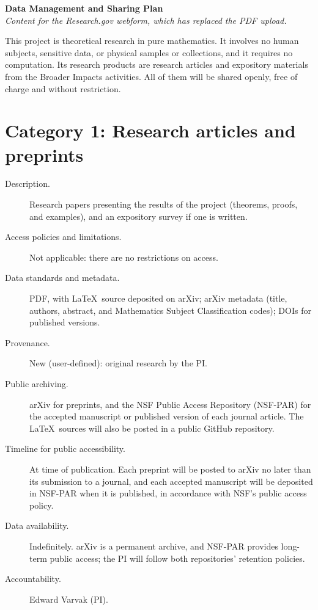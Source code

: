 \documentclass[11pt]{article}
\begin{document}
\begin{center}
  {\Large\bfseries Data Management and Sharing Plan}\\[5pt]
  \emph{Content for the Research.gov webform, which has replaced the PDF upload.}
\end{center}

This project is theoretical research in pure mathematics. It involves no human subjects,
sensitive data, or physical samples or collections, and it requires no computation. Its
research products are research articles and expository materials from the Broader Impacts
activities. All of them will be shared openly, free of charge and without restriction.

\section*{Category 1: Research articles and preprints}

\begin{description}
  \item[Description.] Research papers presenting the results of the project (theorems,
  proofs, and examples), and an expository survey if one is written.
  \item[Access policies and limitations.] Not applicable: there are no restrictions on
  access.
  \item[Data standards and metadata.] PDF, with \LaTeX\ source deposited on arXiv; arXiv
  metadata (title, authors, abstract, and Mathematics Subject Classification codes); DOIs
  for published versions.
  \item[Provenance.] New (user-defined): original research by the PI.
  \item[Public archiving.] arXiv for preprints, and the NSF Public Access Repository
  (NSF-PAR) for the accepted manuscript or published version of each journal article. The
  \LaTeX\ sources will also be posted in a public GitHub repository.
  \item[Timeline for public accessibility.] At time of publication. Each preprint will be
  posted to arXiv no later than its submission to a journal, and each accepted manuscript
  will be deposited in NSF-PAR when it is published, in accordance with NSF's public access
  policy.
  \item[Data availability.] Indefinitely. arXiv is a permanent archive, and NSF-PAR provides
  long-term public access; the PI will follow both repositories' retention policies.
  \item[Accountability.] Edward Varvak (PI).
\end{description}
\end{document}
